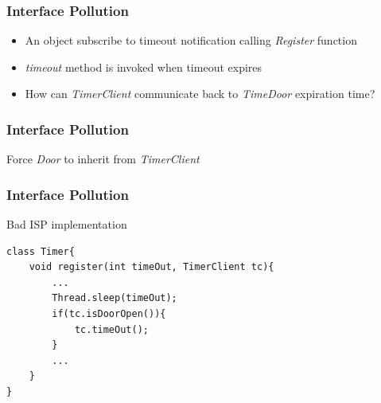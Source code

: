\documentclass{beamer}
\begin{document}
\begin{frame}
  \frametitle{Interface Pollution}
  \begin{itemize}
	\item<+-> An object subscribe to timeout notification calling \textit{Register} function 
	\item<+-> \textit{timeout} method is invoked when timeout expires 
	\item<+-> How can \textit{TimerClient} communicate back to \textit{TimeDoor} expiration time?
   \end{itemize}
\end{frame}

\begin{frame}
	\frametitle{Interface Pollution}
	Force \textit{Door} to inherit from \textit{TimerClient}
	\begin{center}
	\end{center}
\end{frame}

\begin{frame}[containsverbatim]
	\frametitle{Interface Pollution}
	Bad ISP implementation\\
	\begin{lstlisting}
class Timer{
    void register(int timeOut, TimerClient tc){
        ...
        Thread.sleep(timeOut);
        if(tc.isDoorOpen()){
            tc.timeOut();
        }
        ...
    }
}
	\end{lstlisting}
\end{frame}
\end{document}
